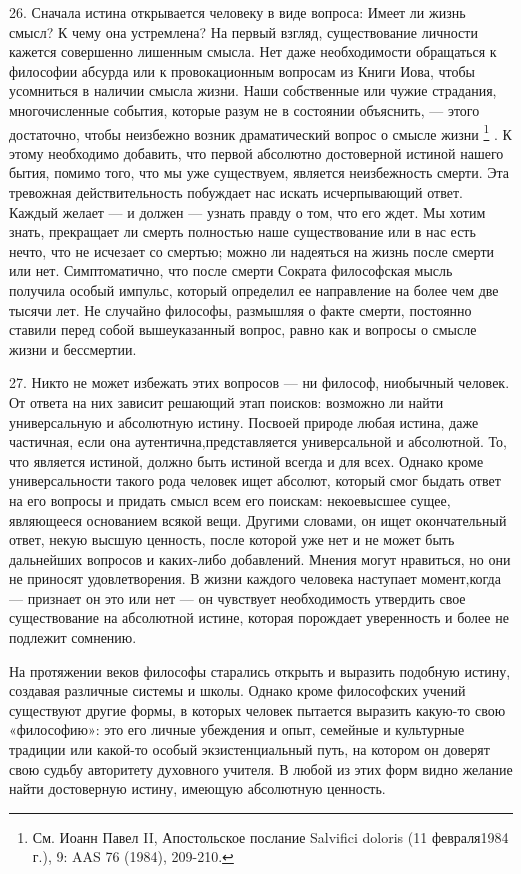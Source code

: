 \documentclass[a5paper,10pt]{article}
\begin{document}
26. Сначала истина открывается человеку в виде вопроса: Имеет ли жизнь смысл? К
чему она устремлена? На первый взгляд, существование личности кажется
совершенно лишенным смысла. Нет даже необходимости обращаться к философии
абсурда или к провокационным вопросам из Книги Иова, чтобы усомниться в наличии
смысла жизни. Наши собственные или чужие страдания, многочисленные события,
которые разум не в состоянии объяснить, — этого достаточно, чтобы неизбежно
возник драматический вопрос о смысле жизни \footnote{См. Иоанн Павел II,
Апостольское послание Salvifici doloris (11 февраля1984 г.), 9: AAS 76 (1984),
209-210.}  . К этому необходимо добавить, что первой абсолютно достоверной
истиной нашего бытия, помимо того, что мы уже существуем, является неизбежность
смерти. Эта тревожная действительность побуждает нас искать исчерпывающий
ответ. Каждый желает — и должен — узнать правду о том, что его ждет. Мы хотим
знать, прекращает ли смерть полностью наше существование или в нас есть нечто,
что не исчезает со смертью; можно ли надеяться на жизнь после смерти или нет.
Симптоматично, что после смерти Сократа философская мысль получила особый
импульс, который определил ее направление на более чем две тысячи лет. Не
случайно философы, размышляя о факте смерти, постоянно ставили перед собой
вышеуказанный вопрос, равно как и вопросы о смысле жизни и бессмертии.

27. Никто не может избежать этих вопросов — ни философ, ниобычный человек. От
ответа на них зависит решающий этап поисков: возможно ли найти универсальную и
абсолютную истину. Посвоей природе любая истина, даже частичная, если она
аутентична,представляется универсальной и абсолютной. То, что является истиной,
должно быть истиной всегда и для всех. Однако кроме универсальности такого рода
человек ищет абсолют, который смог быдать ответ на его вопросы и придать смысл
всем его поискам: некоевысшее сущее, являющееся основанием всякой вещи. Другими
словами, он ищет окончательный ответ, некую высшую ценность, после которой уже
нет и не может быть дальнейших вопросов и каких-либо добавлений. Мнения могут
нравиться, но они не приносят удовлетворения. В жизни каждого человека
наступает момент,когда — признает он это или нет — он чувствует необходимость
утвердить свое существование на абсолютной истине, которая порождает
уверенность и более не подлежит сомнению.

На протяжении веков философы старались открыть и выразить подобную истину,
создавая различные системы и школы. Однако кроме философских учений существуют
другие формы, в которых человек пытается выразить какую-то свою «философию»:
это его личные убеждения и опыт, семейные и культурные традиции или какой-то
особый экзистенциальный путь, на котором он доверят свою судьбу авторитету
духовного учителя. В любой из этих форм видно желание найти достоверную истину,
имеющую абсолютную ценность.
\end{document}
